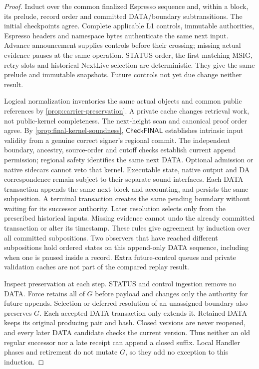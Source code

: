 \documentclass[11pt,a4paper]{article}
\newcommand{\tagg}[1]{\ensuremath{\mathsf{#1}}}
\begin{document}
\begin{proof}
Induct over the common finalized Espresso sequence and, within a block,
its prelude, record order and committed DATA/boundary subtransitions.
The initial checkpoints agree. Complete applicable L1 controls,
immutable authorities, Espresso headers and namespace bytes authenticate
the same next input. Advance announcement supplies controls before their
crossing; missing actual evidence pauses at the same operation. STATUS order, the first matching MSIG, retry slots and historical
NextLive selection are deterministic. They give the same prelude and
immutable snapshots. Future controls not yet due change neither result.

Logical normalization inventories the same actual objects and common
public references by \cref{prop:carrier-preservation}. A private cache
changes retrieval work, not public-kernel completeness. The next-height
scan and canonical proof order agree. By \cref{prop:final-kernel-soundness},
\tagg{CheckFINAL} establishes intrinsic input validity from a genuine
correct signer's regional commit. The independent boundary, ancestry,
source-order and cutoff checks establish current append permission;
regional safety identifies the same next DATA. Optional admission or
native sidecars cannot veto that kernel. Executable state, native output
and DA correspondence remain subject to their separate sound interfaces. Each DATA transaction appends the
same next block and accounting, and persists the same subposition.
A terminal transaction creates the same pending boundary without waiting
for its successor authority. Later resolution selects only from the prescribed historical inputs. Missing evidence
cannot undo the already committed transaction or alter its timestamp.
These rules give agreement by induction over all committed subpositions.
Two observers that have reached different subpositions hold ordered
states on this append-only DATA sequence, including when one is paused
inside a record. Extra future-control queues and private validation
caches are not part of the compared replay result.

Inspect preservation at each step. STATUS and control ingestion remove no DATA. Force retains all of $G$ before payload and changes only
the authority for future appends. Selection or deferred resolution of an unassigned boundary
also preserves $G$. Each accepted DATA transaction only extends it. Retained DATA keeps its
original producing pair and hash. Closed versions are never reopened,
and every later DATA candidate checks the current version. Thus
neither an old regular successor nor a late receipt can append a closed
suffix. Local Handler phases and retirement do not mutate $G$, so they
add no exception to this induction.
\end{proof}
\end{document}
